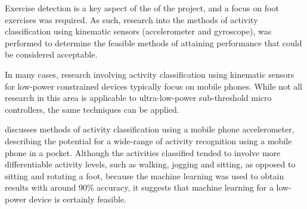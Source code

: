 
	
	Exercise detection is a key aspect of the of the project, and a focus on foot exercises was required. As such, research into the methods of activity classification using kinematic sensors (accelerometer and gyroscope), was performed to determine the feasible methods of attaining performance that could be considered acceptable.
	
	In many cases, research involving activity classification using kinematic sensors for low-power constrained devices typically focus on mobile phones. While not all research in this area is applicable to ultra-low-power sub-threshold micro controllers, the same techniques can be applied.
	
	\cite{kwapisz2011activity} discusses methods of activity classification using a mobile phone accelerometer, describing the potential for a wide-range of activity recognition using a mobile phone in a pocket. Although the activities classified tended to involve more differentiable activity levels, such as walking, jogging and sitting, as opposed to sitting and rotating a foot, because the machine learning was used to obtain results with around 90\% accuracy, it suggests that machine learning for a low-power device is certainly feasible. 
	
	
